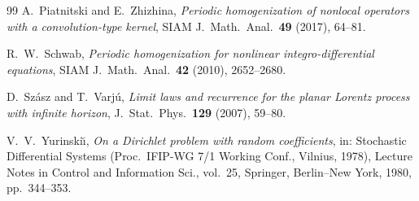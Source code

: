 \documentclass[11pt]{amsart}
\numberwithin{equation}{section}
\begin{document}
\begin{thebibliography}{99}
A.~Piatnitski and E.~Zhizhina,
\emph{Periodic homogenization of nonlocal operators with a convolution-type kernel},
SIAM J.\ Math.\ Anal.\ \textbf{49} (2017), 64--81.

R.~W.~Schwab,
\emph{Periodic homogenization for nonlinear integro-differential equations},
SIAM J.\ Math.\ Anal.\ \textbf{42} (2010), 2652--2680.

D.~Sz\'asz and T.~Varj\'u,
\emph{Limit laws and recurrence for the planar Lorentz process with infinite horizon},
J.\ Stat.\ Phys.\ \textbf{129} (2007), 59--80.

V.~V.~Yurinski\u{\i},
\emph{On a Dirichlet problem with random coefficients},
in: Stochastic Differential Systems (Proc.\ IFIP-WG 7/1 Working Conf., Vilnius, 1978), Lecture Notes in Control and Information Sci., vol.~25, Springer, Berlin--New York, 1980, pp.~344--353.

\end{thebibliography}
\end{document}
